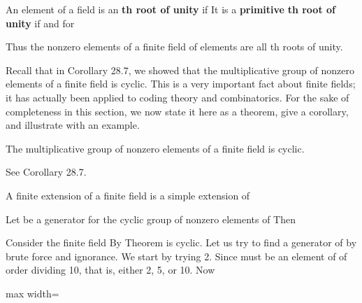 \documentclass[11pt,oneside]{article}
\begin{document}
\begin{BookBody}
 An element \BookInline{\alpha } of a field is an \textbf{th root of unity} if  It is a\textbf{ primitive} \textbf{th root of} \textbf{unity} if  and  for \BookEnd{\blacksquare}

Thus the nonzero elements of a finite field of  elements are all th roots of unity.

Recall that in Corollary 28.7, we showed that the multiplicative group of nonzero elements of a finite field is cyclic. This is a very important fact about finite fields; it has actually been applied to coding theory and combinatorics. For the sake of completeness in this section, we now state it here as a theorem, give a corollary, and illustrate with an example.

 The multiplicative group  of nonzero elements of a finite field  is cyclic.

 See Corollary 28.7. \BookEnd{\blacklozenge}

 A finite extension  of a finite field  is a simple extension of 

 Let \BookInline{\alpha } be a generator for the cyclic group  of nonzero elements of  Then  \BookEnd{\blacklozenge}

 Consider the finite field  By Theorem  is cyclic. Let us try to find a generator of  by brute force and ignorance. We start by trying 2. Since  must be an element of  of order dividing 10, that is, either 2, 5, or 10. Now

\begin{center}\begin{adjustbox}{max width=\linewidth}\end{adjustbox}\end{center}


\end{BookBody}
\end{document}
